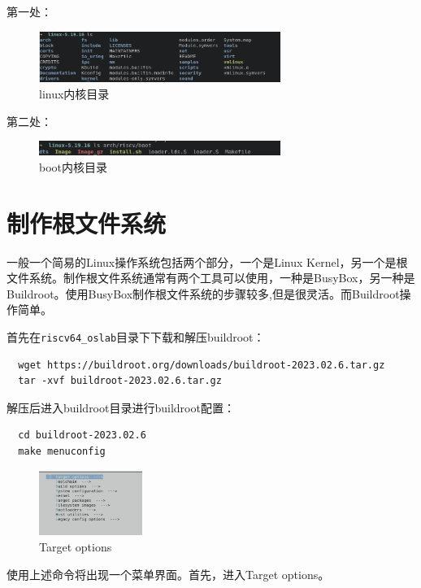 \documentclass[lang=cn,10pt]{elegantbook}
\begin{document}
第一处：
\begin{figure}[htbp]
  \centering
  \includegraphics[width=0.7\textwidth]{image/image-20231105100626287.png}
  \caption{linux内核目录}
\end{figure}

第二处：
\begin{figure}[htbp]
  \centering
  \includegraphics[width=0.7\textwidth]{image/image-20231105100648963.png}
  \caption{boot内核目录}
\end{figure}

\section{制作根文件系统}
一般一个简易的Linux操作系统包括两个部分，一个是Linux Kernel，另一个是根文件系统。制作根文件系统通常有两个工具可以使用，一种是BusyBox，另一种是Buildroot。使用BusyBox制作根文件系统的步骤较多,但是很灵活。而Buildroot操作简单。

首先在\lstinline{riscv64_oslab}目录下下载和解压buildroot：

\begin{lstlisting}
  wget https://buildroot.org/downloads/buildroot-2023.02.6.tar.gz
  tar -xvf buildroot-2023.02.6.tar.gz
\end{lstlisting}

解压后进入buildroot目录进行buildroot配置：

\begin{lstlisting}
  cd buildroot-2023.02.6
  make menuconfig
\end{lstlisting}

\begin{figure}[htbp]
  \centering
  \includegraphics[width=0.3\textwidth]{image/image-20231105101258501.png}
  \caption{Target options}
\end{figure}
使用上述命令将出现一个菜单界面。首先，进入Target options。
\end{document}
